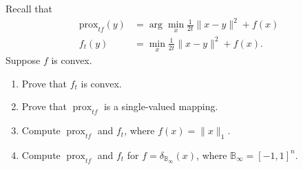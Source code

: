\documentclass[10pt]{article}
\newcommand{\prox}{\operatorname{prox}}
\begin{document}
\begin{problem}[Problem 2]
Recall that 
\[
\begin{aligned}
\mbox{prox}_{t f}(y) &= \arg\min_{x} \frac{1}{2t}\|x-y\|^2 + f(x)\\
f_t(y) &= \min_x \frac{1}{2t}\|x-y\|^2 + f(x).
\end{aligned}
\] 
Suppose \( f \) is convex. 
\begin{enumerate}[label=(\alph*)]
\item Prove that \( f_t \) is convex.  
\item Prove that \( \prox_{t f} \) is a single-valued mapping. 
\item Compute \( \prox_{t f} \) and \( f_t \), where \( f(x) = \|x\|_1 \). 
\item Compute \( \prox_{t f} \) and \( f_t \) for \( f = \delta_{\mathbb{B}_{\infty}}(x) \), 
where \( \mathbb{B}_\infty = [-1,1]^n \).
\end{enumerate}
\end{problem}
\end{document}
